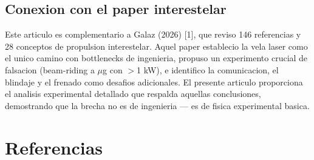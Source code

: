 \documentclass[11pt,a4paper,onecolumn]{article}
\begin{document}
\subsection{Conexion con el paper interestelar}

Este articulo es complementario a Galaz (2026) [1], que reviso 146 referencias y 28 conceptos de propulsion interestelar. Aquel paper establecio la vela laser como el unico camino con bottlenecks de ingenieria, propuso un experimento crucial de falsacion (beam-riding a $\mu$g con $>$1 kW), e identifico la comunicacion, el blindaje y el frenado como desafios adicionales. El presente articulo proporciona el analisis experimental detallado que respalda aquellas conclusiones, demostrando que la brecha no es de ingenieria --- es de fisica experimental basica.

\section*{Referencias}
\end{document}
